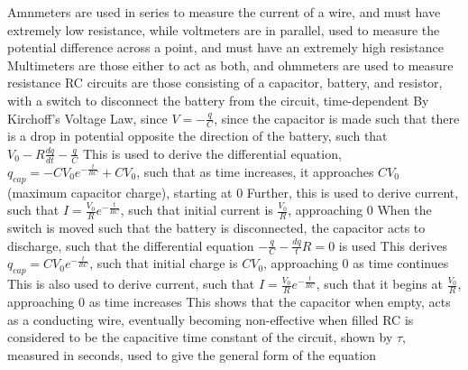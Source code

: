 \documentclass[11 pt, twoside]{article}
\newenvironment{outline*}
{
	\begin{outline}[enumerate]
	}
	{\end{outline}
}
\begin{document}
\begin{outline*}
\1 Amnmeters are used in series to measure the current of a wire, and must have extremely low resistance, while voltmeters are in parallel, used to measure the potential difference across a point, and must have an extremely high resistance
\2 Multimeters are those either to act as both, and ohmmeters are used to measure resistance
\1 RC circuits are those consisting of a capacitor, battery, and resistor, with a switch to disconnect the battery from the circuit, time-dependent
\2 By Kirchoff's Voltage Law, since $V = -\frac{q}{C}$, since the capacitor is made such that there is a drop in potential opposite the direction of the battery, such that $V_0 - R\frac{dq}{dt} - \frac{q}{C}$
\3 This is used to derive the differential equation, $q_{cap} = -CV_0e^{-\frac{t}{RC}} + CV_0$, such that as time increases, it approaches $CV_0$ (maximum capacitor charge), starting at 0
\3 Further, this is used to derive current, such that $I = \frac{V_0}{R}e^{-\frac{t}{RC}}$, such that initial current is $\frac{V_0}{R}$, approaching 0
\2 When the switch is moved such that the battery is disconnected, the capacitor acts to discharge, such that the differential equation $-\frac{q}{C} - \frac{dq}{t}R = 0$ is used
\3 This derives $q_{cap} = CV_0e^{-\frac{t}{RC}}$, such that initial charge is $CV_0$, approaching 0 as time continues
\3 This is also used to derive current, such that $I = \frac{V_0}{R}e^{-\frac{t}{RC}}$, such that it begins at $\frac{V_0}{R}$, approaching 0 as time increases
\2 This shows that the capacitor when empty, acts as a conducting wire, eventually becoming non-effective when filled
\2 RC is considered to be the capacitive time constant of the circuit, shown by $\tau$, measured in seconds, used to give the general form of the equation
\end{outline*}
\end{document}
